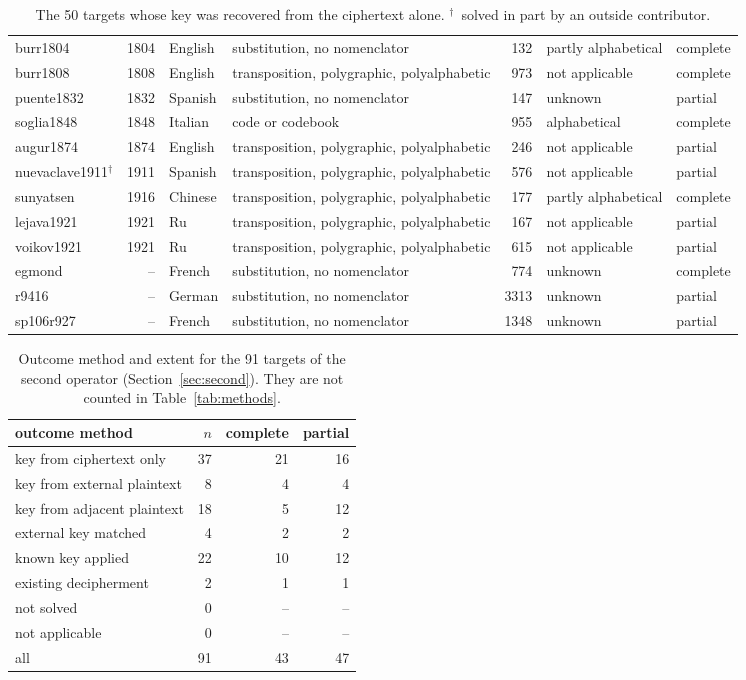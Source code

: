 \begin{table}[t]
{\begin{tabular}{@{}lrllrll@{}}
burr1804 & 1804 & English & substitution, no nomenclator & 132 & partly alphabetical & complete \\
burr1808 & 1808 & English & transposition, polygraphic, polyalphabetic & 973 & not applicable & complete \\
puente1832 & 1832 & Spanish & substitution, no nomenclator & 147 & unknown & partial \\
soglia1848 & 1848 & Italian & code or codebook & 955 & alphabetical & complete \\
augur1874 & 1874 & English & transposition, polygraphic, polyalphabetic & 246 & not applicable & partial \\
nuevaclave1911$^\dagger$ & 1911 & Spanish & transposition, polygraphic, polyalphabetic & 576 & not applicable & partial \\
sunyatsen & 1916 & Chinese & transposition, polygraphic, polyalphabetic & 177 & partly alphabetical & complete \\
lejava1921 & 1921 & Ru & transposition, polygraphic, polyalphabetic & 167 & not applicable & partial \\
voikov1921 & 1921 & Ru & transposition, polygraphic, polyalphabetic & 615 & not applicable & partial \\
egmond & -- & French & substitution, no nomenclator & 774 & unknown & complete \\
r9416 & -- & German & substitution, no nomenclator & 3313 & unknown & partial \\
sp106r927 & -- & French & substitution, no nomenclator & 1348 & unknown & partial \\
\bottomrule
\end{tabular}}
\caption{\label{tab:ct} The 50 targets whose key was recovered from the ciphertext alone. $^\dagger$~solved in part by an outside contributor.}
\end{table}

\begin{table}[t]
\centering\small
\begin{tabular}{@{}lrrr@{}}
\toprule
outcome method & $n$ & complete & partial \\
\midrule
key from ciphertext only & 37 & 21 & 16 \\
key from external plaintext & 8 & 4 & 4 \\
key from adjacent plaintext & 18 & 5 & 12 \\
external key matched & 4 & 2 & 2 \\
known key applied & 22 & 10 & 12 \\
existing decipherment & 2 & 1 & 1 \\
\midrule
not solved & 0 & -- & -- \\
\midrule
not applicable & 0 & -- & -- \\
\midrule
all & 91 & 43 & 47 \\
\bottomrule
\end{tabular}
\caption{\label{tab:second} Outcome method and extent for the 91 targets of the second operator (Section~\ref{sec:second}). They are not counted in Table~\ref{tab:methods}.}
\end{table}

